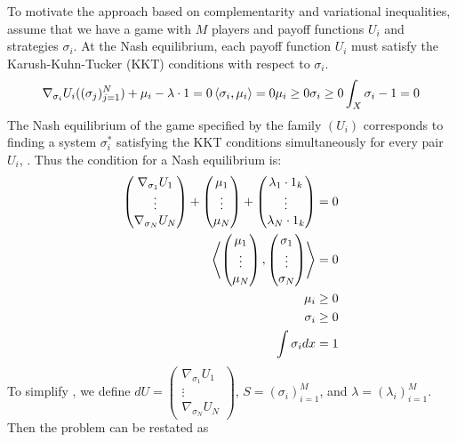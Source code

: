 To motivate the approach based on complementarity and variational inequalities, assume that we have a game with $M$ players and payoff functions $U_i$ and strategies $\sigma_i$. At the Nash equilibrium, each payoff function $U_i$ must satisfy the Karush-Kuhn-Tucker (KKT) conditions with respect to $\sigma_i$.
\begin{align}
  \nabla_{\sigma_i}U_i((\sigma_j)_{j=1}^N) + \mu_i - \lambda \cdot 1 = 0
  \left \langle \sigma_i,\mu_i \right \rangle = 0
  \mu_i \geq 0
  \sigma_i \geq 0
  \int_X \sigma_i - 1 = 0
\end{align}
The Nash equilibrium of the game specified by the family $(U_i)$ corresponds to finding a system $\sigma_i^*$ satisfying the KKT conditions simultaneously for every pair $U_i$, \citep{deimling2010nonlinear}. Thus the condition for a Nash equilibrium is:
\begin{equation}
  \begin{split}
  \begin{pmatrix}
    \nabla_{\sigma_1} U_1 \\
    \vdots \\
    \nabla_{\sigma_N} U_N
\end{pmatrix} + \begin{pmatrix}
    \mu_1 \\
    \vdots \\
    \mu_N
\end{pmatrix} + \begin{pmatrix}
    \lambda_1 \cdot 1_k \\
    \vdots \\
    \lambda_N \cdot 1_k
\end{pmatrix} = 0 \\
\left \langle 
\begin{pmatrix}
  \mu_1 \\
  \vdots \\
  \mu_N
\end{pmatrix}, \begin{pmatrix}
  \sigma_1 \\
  \vdots \\
  \sigma_N
\end{pmatrix} \right \rangle = 0 \\
\mu_i \geq 0 \\
  \sigma_i \geq 0 \\
    \int \sigma_i dx = 1
    \label{eq:KKT_total}
  \end{split}
\end{equation}
To simplify , we define $dU = \begin{pmatrix} \nabla_{\sigma_1} U_1 \\
    \vdots \\
    \nabla_{\sigma_N} U_N \end{pmatrix}$, $S=(\sigma_i)_{i=1}^M$, and $\lambda = (\lambda_i)_{i=1}^M$. Then the problem can be restated as
